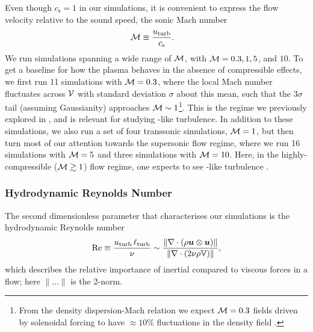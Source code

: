 Even though $c_\mathrm{s} = 1$ in our simulations, it is convenient to express the flow velocity relative to the sound speed, \ie the sonic Mach number
\begin{align}
    \mathcal{M}
        &\equiv \frac{u_\mathrm{turb}}{c_\mathrm{s}}
        . \label{dfn:Mach}
\end{align}
We run simulations spanning a wide range of $\mathcal{M}$, with $\mathcal{M} = 0.3, 1, 5$, and $10$. To get a baseline for how the plasma behaves in the absence of compressible effects, we first run 11 simulations with $\mathcal{M} = 0.3$, where the local Mach number fluctuates across $\mathcal{V}$ with standard deviation $\sigma$ about this mean, such that the $3\sigma$ tail (assuming Gaussianity) approaches $\mathcal{M} \sim 1$\footnote{
    From the density dispersion-Mach relation we expect $\mathcal{M} = 0.3$ fields driven by solenoidal forcing to have $\approx 10\%$ fluctuations in the density field \citep{padoan1997supersonic, passot2003correlation, federrath2008density, federrath2010comparing, price2010density, gerrard2023new}.
}. This is the regime we previously explored in , and is relevant for studying \citet{kolmogorov1941dissipation}-like turbulence. In addition to these simulations, we also run a set of four transsonic simulations, $\mathcal{M} = 1$, but then turn most of our attention towards the supersonic flow regime, where we run 16 simulations with $\mathcal{M} = 5$ and three simulations with $\mathcal{M} = 10$. Here, in the highly-compressible ($\mathcal{M} \gtrsim 1$) flow regime, one expects to see \citet{burgers1948_turbulence_model}-like turbulence \citep[see for example][]{federrath2013universality, Federrath2021_sonic_scale}.

\subsubsection{Hydrodynamic Reynolds Number}

The second dimensionless parameter that characterises our simulations is the hydrodynamic Reynolds number
\begin{align}
    \mathrm{Re}
        \equiv \frac{u_\mathrm{turb} \,\ell_\mathrm{turb}}{\nu}
        \sim \frac{
                \|\nabla\cdot(\rho\bm{u}\otimes\bm{u})\|
            }{
                \|\nabla\cdot(2\nu\rho\mathbb{V})\|
            }
        , \label{dfn:Reyh}
\end{align}
which describes the relative importance of inertial compared to viscous forces in a flow; here $\|\dots\|$ is the 2-norm.

